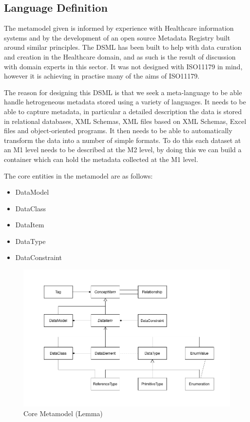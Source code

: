 \documentclass{llncs}
\begin{document}
\subsection{Language Definition}

The metamodel given is informed by experience with Healthcare information systems \cite{DSMCR} and by the development of an open source Metadata Registry built around similar principles. The DSML has been built to help with data curation and creation in the Healthcare domain, and as such is the result of discussion with domain experts in this sector.  It was not designed with ISO11179  in mind, however it is achieving in practise many of the aims of ISO11179. 


The reason for designing this DSML  is that we seek a meta-language to be able handle hetrogeneous metadata stored using a variety of languages. It needs to be able to capture metadata, in particular a detailed description the data is stored in relational databases, XML Schemas, XML files based on XML Schemas, Excel files and object-oriented programs. It then needs to be able to automatically transform the data into a number of simple formats. To do this each dataset at an M1 level needs to be described at the M2 level, by doing this we can build a container which can hold the metadata collected at the M1 level.

The core entities in the metamodel are as follows:
\begin{itemize}
\item DataModel
\item DataClass
\item DataItem
\item DataType
\item DataConstraint
\end{itemize}

\begin{figure}[h]
\includegraphics[width=1.0\textwidth,natwidth=610,natheight=642]{LemmaCore1}
\caption{Core Metamodel (Lemma)} 
\label{fig:lemma}
\end{figure}
\end{document}
